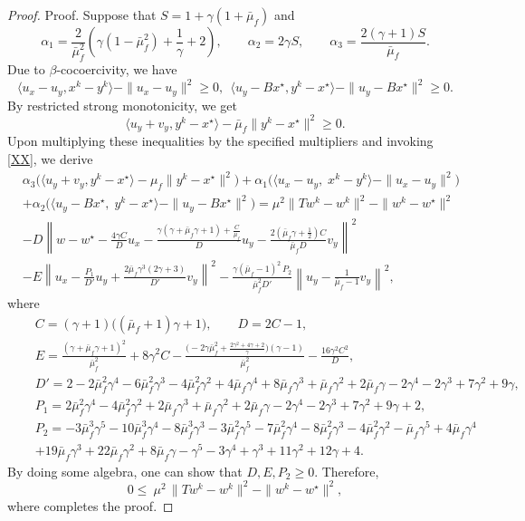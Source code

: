 \documentclass[ijoc,sglanonrev]{informs4}
\begin{document}
\begin{proof}{Proof.}
Suppose that $S=1+\gamma(1+\bar\mu_f)$ and
\[
\alpha_1=\frac{2}{\bar\mu_f^2}\left(\gamma\left(1-\bar\mu_f^2\right)+\frac{1}{\gamma}+2\right),\qquad
\alpha_2=2\gamma S,\qquad
\alpha_3=\frac{2(\gamma+1)S}{\bar\mu_f}.
\]
Due to $\beta$-cocoercivity, we have 
$$
\langle u_x-u_y, x^k-y^k\rangle-\|u_x-u_y\|^2\geq 0, \ \ 
\langle u_y-Bx^\star, y^k-x^\star\rangle-\|u_y-Bx^\star\|^2\geq 0.
$$
By restricted strong monotonicity, we get
$$
\langle u_y+v_y,y^k-x^\star\rangle-\bar\mu_f\|y^k-x^\star\|^2\geq 0.
$$
Upon multiplying these inequalities by the specified multipliers and invoking \eqref{XX}, we derive
\begin{align*}
    &\alpha_3\big(\langle u_y+v_y,y^k-x^\star\rangle-\mu_f\|y^k-x^\star\|^2\big)
+\alpha_1\big(\langle u_x-u_y,\;x^k-y^k\rangle-\|u_x-u_y\|^2\big)\\
&
+\alpha_2\big(\langle u_y-Bx^\star,\;y^k-x^\star\rangle-\|u_y-Bx^\star\|^2\big)
=
\mu^2\| Tw^k-w^k\|^2-\|w^k-w^\star\|^2\\
& -D\left\|w-w^\star-\frac{4\gamma C}{D}u_x
-\frac{\gamma(\gamma+\bar\mu_{f}\gamma+1)+\tfrac{C}{\bar\mu_{f}}}{D}u_y
-\frac{2(\bar\mu_{f}\gamma+\tfrac{1}{2})C}{\bar\mu_{f}D}v_y\right\|^2\\
& -E\left\|u_x-\frac{P_{1}}{D'}u_y+
\frac{2\bar\mu_{f}\gamma^{3}(2\gamma+3)}{D'}v_y\right\|^2
-\frac{\gamma(\bar\mu_{f}-1)^{2}\,P_2}{\bar\mu_{f}^{2}D'}\left\|u_y-\frac{1}{\bar\mu_{f}-1}v_y\right\|^2,
\end{align*}
where
\begin{align*}
& C=(\gamma+1)\big((\bar\mu_{f}+1)\gamma+1\big), 
\qquad 
D  = 2C - 1,\\
& E=\frac{(\gamma+\bar\mu_{f}\gamma+1)^{2}}{\bar\mu_{f}^{2}}
+ 8\gamma^{2}C
- \frac{\Big(-2\gamma\bar\mu_{f}^{2}+\tfrac{2\gamma^{2}+4\gamma+2}{\gamma}\Big)(\gamma-1)}{\bar\mu_{f}^{2}}
- \frac{16\gamma^{2}C^{2}}{D},\\
& D'=2-2\bar\mu_{f}^{2}\gamma^{4} - 6\bar\mu_{f}^{2}\gamma^{3} - 4\bar\mu_{f}^{2}\gamma^{2} 
+ 4\bar\mu_{f}\gamma^{4} + 8\bar\mu_{f}\gamma^{3} + \bar\mu_{f}\gamma^{2} +2\bar\mu_{f}\gamma 
- 2\gamma^{4} - 2\gamma^{3} + 7\gamma^{2} + 9\gamma,\\
& P_{1}=2\bar\mu_{f}^{2}\gamma^{4} - 4\bar\mu_{f}^{2}\gamma^{2} + 2\bar\mu_{f}\gamma^{3} + \bar\mu_{f}\gamma^{2} + 2\bar\mu_{f}\gamma - 2\gamma^{4} - 2\gamma^{3} + 7\gamma^{2} + 9\gamma + 2,\\
& P_2=-3\bar\mu_{f}^{3}\gamma^{5} - 10\bar\mu_{f}^{3}\gamma^{4} - 8\bar\mu_{f}^{3}\gamma^{3} 
- 3\bar\mu_{f}^{2}\gamma^{5} - 7\bar\mu_{f}^{2}\gamma^{4} - 8\bar\mu_{f}^{2}\gamma^{3} - 4\bar\mu_{f}^{2}\gamma^{2}- \bar\mu_{f}\gamma^{5} + 4\bar\mu_{f}\gamma^{4} \\
\quad&  + 19\bar\mu_{f}\gamma^{3} + 22\bar\mu_{f}\gamma^{2} + 8\bar\mu_{f}\gamma- \gamma^{5} - 3\gamma^{4} + \gamma^{3} + 11\gamma^{2} + 12\gamma + 4.
\end{align*}
By doing some algebra, one can show that $D, E, P_2\geq 0$. Therefore,
\[
0\le\ \mu^2\,\|Tw^k-w^k\|^2-\|w^k-w^\star\|^2,
\]
where completes the proof.
\Halmos
\end{proof}
\end{document}
